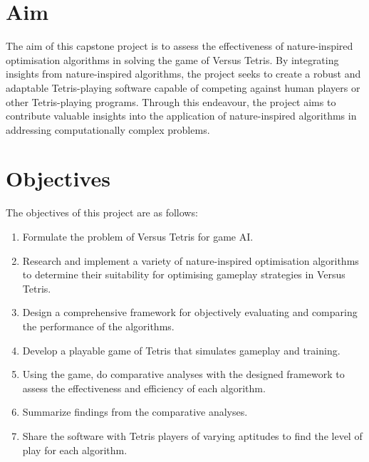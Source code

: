 \documentclass[a4paper, 12pt]{extreport}
\begin{document}
		\section{Aim}
		
			
			The aim of this capstone project is to assess the effectiveness of nature-inspired optimisation algorithms in solving the game of Versus Tetris. By integrating insights from nature-inspired algorithms, the project seeks to create a robust and adaptable Tetris-playing software capable of competing against human players or other Tetris-playing programs. Through this endeavour, the project aims to contribute valuable insights into the application of nature-inspired algorithms in addressing computationally complex problems.
		
		\section{Objectives}
		
			
			The objectives of this project are as follows:
			
			\begin{enumerate}
				\item Formulate the problem of Versus Tetris for game AI.
				\item Research and implement a variety of nature-inspired optimisation algorithms to determine their suitability for optimising gameplay strategies in Versus Tetris.
				\item Design a comprehensive framework for objectively evaluating and comparing the performance of the algorithms.
				\item Develop a playable game of Tetris that simulates gameplay and training.
				\item Using the game, do comparative analyses with the designed framework to assess the effectiveness and efficiency of each algorithm.
				\item Summarize findings from the comparative analyses.
				\item Share the software with Tetris players of varying aptitudes to find the level of play for each algorithm.
			\end{enumerate}
		
\end{document}
